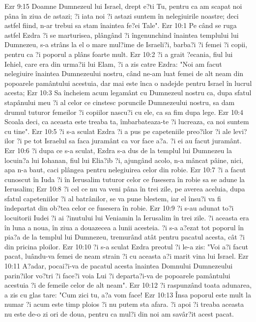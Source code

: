 Ezr 9:15  Doamne Dumnezeul lui Israel, drept e?ti Tu, pentru ca am scapat noi pâna în ziua de astazi; ?i iata noi ?i astazi suntem în nelegiuirile noastre; deci astfel fiind, n-ar trebui sa stam înaintea fe?ei Tale".
Ezr 10:1  Pe când se ruga astfel Ezdra ?i se marturisea, plângând ?i îngenunchind înaintea templului lui Dumnezeu, s-a strâns la el o mare mul?ime de Israeli?i, barba?i ?i femei ?i copii, pentru ca ?i poporul a plâns foarte mult.
Ezr 10:2  ?i a grait ?ecania, fiul lui Iehiel, care era din urma?ii lui Elam, ?i a zis catre Ezdra: "Noi am facut nelegiuire înaintea Dumnezeului nostru, când ne-am luat femei de alt neam din popoarele pamântului acestuia, dar mai este înca o nadejde pentru Israel în lucrul acesta;
Ezr 10:3  Sa încheiem acum legamânt cu Dumnezeul nostru ca, dupa sfatul stapânului meu ?i al celor ce cinstesc poruncile Dumnezeului nostru, sa dam drumul tuturor femeilor ?i copiilor nascu?i cu ele, ca sa fim dupa lege.
Ezr 10:4  Scoala deci, ca aceasta este treaba ta, îmbarbateaza-te ?i lucreaza, ca noi suntem cu tine".
Ezr 10:5  ?i s-a sculat Ezdra ?i a pus pe capeteniile preo?ilor ?i ale levi?ilor ?i pe tot Israelul sa faca juramânt ca vor face a?a. ?i ei au facut juramânt.
Ezr 10:6  ?i dupa ce s-a sculat, Ezdra s-a dus de la templul lui Dumnezeu la locuin?a lui Iohanan, fiul lui Elia?ib ?i, ajungând acolo, n-a mâncat pâine, nici, apa n-a baut, caci plângea pentru nelegiuirea celor din robie.
Ezr 10:7  ?i a facut cunoscut în Iuda ?i în Ierusalim tuturor celor ce fusesera în robie sa se adune la Ierusalim;
Ezr 10:8  ?i cel ce nu va veni pâna în trei zile, pe averea aceluia, dupa sfatul capeteniilor ?i al batrânilor, se va pune blestem, iar el însu?i va fi îndepartat din ob?tea celor ce fusesera în robie.
Ezr 10:9  ?i s-au adunat to?i locuitorii Iudei ?i ai ?inutului lui Veniamin la Ierusalim în trei zile. ?i aceasta era în luna a noua, în ziua a douazecea a lunii acesteia. ?i s-a a?ezat tot poporul în pia?a de la templul lui Dumnezeu, tremurând atât pentru pacatul acesta, cât ?i din pricina ploilor.
Ezr 10:10  ?i s-a sculat Ezdra preotul ?i le-a zis: "Voi a?i facut pacat, luându-va femei de neam strain ?i cu aceasta a?i marit vina lui Israel.
Ezr 10:11  A?adar, pocai?i-va de pacatul acesta înaintea Domnului Dumnezeului parin?ilor vo?tri ?i face?i voia Lui ?i departa?i-va de popoarele pamântului acestuia ?i de femeile celor de alt neam".
Ezr 10:12  ?i raspunzând toata adunarea, a zis cu glas tare: "Cum zici tu, a?a vom face!
Ezr 10:13  Însa poporul este mult la numar ?i acum este timp ploios ?i nu putem sta afara. ?i apoi ?i treaba aceasta nu este de-o zi ori de doua, pentru ca mul?i din noi am savâr?it acest pacat.
